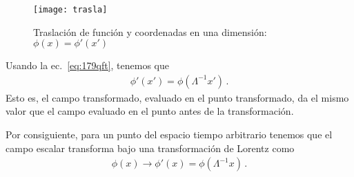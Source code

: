 \begin{figure} %
  \centering %
  \texttt{[image: trasla]} %
  \caption{Traslaci\'on de funci\'on y coordenadas en una dimensi\'on: $\phi(x)=\phi'(x')$ } %
  \label{fig:trasla} %
\end{figure} %




Usando la ec.~\eqref{eq:179qft}, tenemos que
\begin{align}
    \phi'(x')=\phi(\Lambda^{-1}x')\,.
\end{align}
Esto es, el campo transformado, evaluado en el punto transformado, da el mismo valor que el campo evaluado en el punto antes de la transformación. 

\begin{frame}

Por consiguiente, para un punto del espacio tiempo arbitrario tenemos
que el campo escalar transforma bajo una transformación de Lorentz como
\begin{align}
  \label{eq:scalarlorentz}
 \phi(x)\to  \phi'(x)=\phi(\Lambda^{-1}x)\,.
\end{align}
\end{frame}

